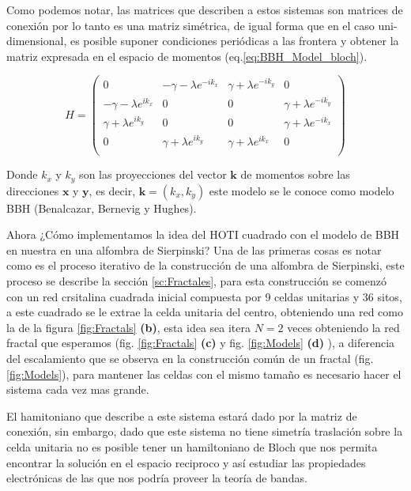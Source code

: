      
    Como podemos notar, las matrices que describen a estos sistemas son matrices de conexión por lo tanto es una matriz simétrica, de igual forma que en el caso uni-dimensional, es posible suponer condiciones periódicas a las frontera y obtener la matriz expresada en el espacio de momentos (eq.\ref{eq:BBH_Model_bloch}).
    
    \begin{equation}
    \label{eq:BBH_Model_bloch}
    H =      
     \begin{pmatrix}
            0 & -\gamma - \lambda e^{-ik_x} & \gamma + \lambda e^{-ik_y} &  0 \\
             -\gamma - \lambda e^{ik_x} & 0 &  0 & \gamma + \lambda e^{-ik_y}  \\
             \gamma + \lambda e^{ik_y} & 0 & 0 &  \gamma + \lambda e^{-ik_x} \\
             0 & \gamma + \lambda e^{ik_y} &  \gamma + \lambda e^{ik_x} & 0  \\
     \end{pmatrix} 
    \end{equation}

Donde $k_x$ y $k_y$ son las proyecciones del vector $\mathbf{k}$ de momentos sobre las direcciones $\mathbf{x}$ y $\mathbf{y}$, es decir, $\mathbf{k} = (k_x, k_y)$ este modelo se le conoce como modelo BBH (Benalcazar, Bernevig y Hughes). 


Ahora ¿Cómo implementamos la idea del HOTI cuadrado con el modelo de BBH en nuestra en una alfombra de Sierpinski? Una de las primeras cosas es notar como es el proceso iterativo de la construcción de una alfombra de Sierpinski, este proceso se describe la sección \ref{sc:Fractales}, para esta construcción se comenzó con un red crsitalina cuadrada inicial compuesta por 9 celdas unitarias y 36 sitos, a este cuadrado se le extrae la celda unitaria del centro, obteniendo una red como la de la figura \ref{fig:Fractals} \textbf{(b)}, esta idea sea itera $N=2$ veces obteniendo la red fractal que esperamos (fig. \ref{fig:Fractals} \textbf{(c)} y fig. \ref{fig:Models} \textbf{(d)} ), a diferencia del escalamiento que se observa en la construcción común de un fractal (fig. \ref{fig:Models}), para mantener las celdas con el mismo tamaño es necesario hacer el sistema cada vez mas grande. 

El hamitoniano que describe a este sistema estará dado por la matriz de conexión, sin embargo, dado que este sistema no tiene simetría traslación sobre la celda unitaria no es posible tener un hamiltoniano de Bloch que nos permita encontrar la solución en el espacio reciproco y así estudiar las propiedades electrónicas de las que nos podría proveer la teoría de bandas.

